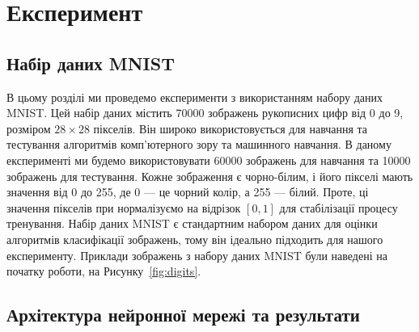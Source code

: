 \chapter{Експеримент}

\section{Набір даних MNIST}

В цьому розділі ми проведемо експерименти з використанням набору даних MNIST.
Цей набір даних містить 70000 зображень рукописних цифр від 0 до 9, розміром $28
\times 28$ пікселів. Він широко використовується для навчання та тестування
алгоритмів комп'ютерного зору та машинного навчання. В даному експерименті ми
будемо використовувати 60000 зображень для навчання та 10000 зображень для
тестування. Кожне зображення є чорно-білим, і його пікселі мають значення від 0
до 255, де 0 --- це чорний колір, а 255 --- білий. Проте, ці значення пікселів
при нормалізуємо на відрізок $[0,1]$ для стабілізації процесу тренування. Набір
даних MNIST є стандартним набором даних для оцінки алгоритмів класифікації
зображень, тому він ідеально підходить для нашого експерименту. Приклади
зображень з набору даних MNIST були наведені на початку роботи, на
Рисунку~\ref{fig:digits}.

\section{Архітектура нейронної мережі та результати}

